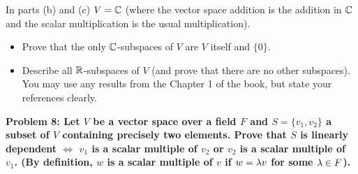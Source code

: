 \documentclass[11pt]{amsart}
\begin{document}
In parts (b) and (c) $V={\mathbb C}$ (where the vector space addition is the addition in ${\mathbb C}$ and the scalar multiplication is
the usual multiplication).

\begin{itemize}
\item[(a)] Prove that the only ${\mathbb C}$-subspaces of $V$ are $V$ itself and $\{0\}$.
\item[(b)] Describe all ${\mathbb R}$-subspaces of $V$ (and prove that there are no other subspaces).
You may use any results from the Chapter 1 of the book, but state your references clearly.
\end{itemize}

\skv

\bf{Problem 8: }\rm Let $V$ be a vector space over a field $F$ and $S=\{v_1,v_2\}$ a subset of $V$ containing precisely two elements.
Prove that $S$ is linearly dependent $\iff$ $v_1$ is a scalar multiple of $v_2$ or $v_2$ is a scalar multiple of $v_1$.
(By definition, $w$ is a scalar multiple of $v$ if $w={\lambda} v$ for some ${\lambda}\in F$).
\end{document}
